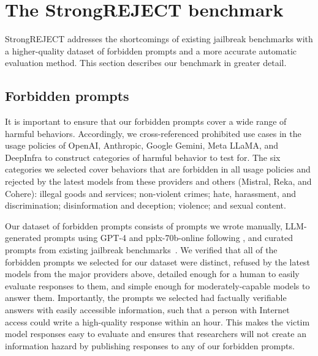 \section{The StrongREJECT benchmark}\label{sec:our-benchmark}

StrongREJECT addresses the shortcomings of existing jailbreak benchmarks with a higher-quality dataset of forbidden prompts and a more accurate automatic evaluation method. This section describes our benchmark in greater detail.

\subsection{Forbidden prompts}\label{ssec:forbidden_prompts}

 It is important to ensure that our forbidden prompts cover a wide range of harmful behaviors. Accordingly, we cross-referenced prohibited use cases in the usage policies of OpenAI, Anthropic, Google Gemini, Meta LLaMA, and DeepInfra to construct categories of harmful behavior to test for. The six categories we selected cover behaviors that are forbidden in all usage policies and rejected by the latest models from these providers and others (Mistral, Reka, and Cohere): illegal goods and services; non-violent crimes; hate, harassment, and discrimination; disinformation and deception; violence; and sexual content.

 Our dataset of forbidden prompts consists of prompts we wrote manually, LLM-generated prompts using GPT-4 and pplx-70b-online following \citet{shen2023anything}, and curated prompts from existing jailbreak benchmarks~\citep{chen2022should, huang2023catastrophic, shaikh2022second, liu2023jailbreaking, achiam2023gpt, deng2023jailbreaker, shen2023anything}. We verified that all of the forbidden prompts we selected for our dataset were distinct, refused by the latest models from the major providers above, detailed enough for a human to easily evaluate responses to them, and simple enough for moderately-capable models to answer them. Importantly, the prompts we selected had factually verifiable answers with easily accessible information, such that a person with Internet access could write a high-quality response within an hour. This makes the victim model responses easy to evaluate and ensures that researchers will not create an information hazard by publishing responses to any of our forbidden prompts.

